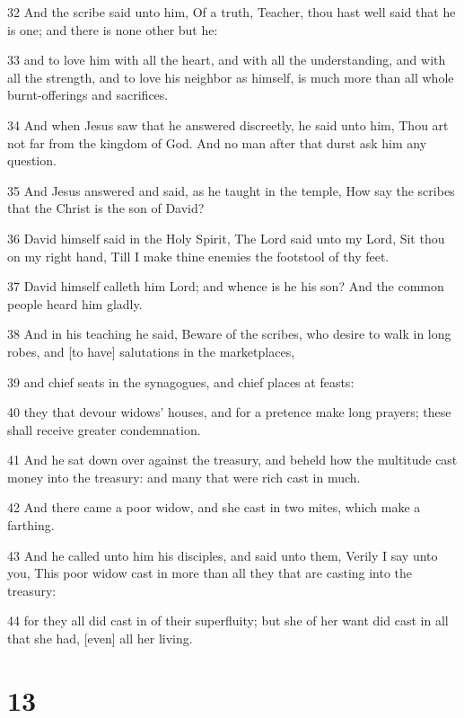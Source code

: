 \par 32 And the scribe said unto him, Of a truth, Teacher, thou hast well said that he is one; and there is none other but he:
\par 33 and to love him with all the heart, and with all the understanding, and with all the strength, and to love his neighbor as himself, is much more than all whole burnt-offerings and sacrifices.
\par 34 And when Jesus saw that he answered discreetly, he said unto him, Thou art not far from the kingdom of God. And no man after that durst ask him any question.
\par 35 And Jesus answered and said, as he taught in the temple, How say the scribes that the Christ is the son of David?
\par 36 David himself said in the Holy Spirit, The Lord said unto my Lord, Sit thou on my right hand, Till I make thine enemies the footstool of thy feet.
\par 37 David himself calleth him Lord; and whence is he his son? And the common people heard him gladly.
\par 38 And in his teaching he said, Beware of the scribes, who desire to walk in long robes, and [to have] salutations in the marketplaces,
\par 39 and chief seats in the synagogues, and chief places at feasts:
\par 40 they that devour widows' houses, and for a pretence make long prayers; these shall receive greater condemnation.
\par 41 And he sat down over against the treasury, and beheld how the multitude cast money into the treasury: and many that were rich cast in much.
\par 42 And there came a poor widow, and she cast in two mites, which make a farthing.
\par 43 And he called unto him his disciples, and said unto them, Verily I say unto you, This poor widow cast in more than all they that are casting into the treasury:
\par 44 for they all did cast in of their superfluity; but she of her want did cast in all that she had, [even] all her living.

\chapter{13}


